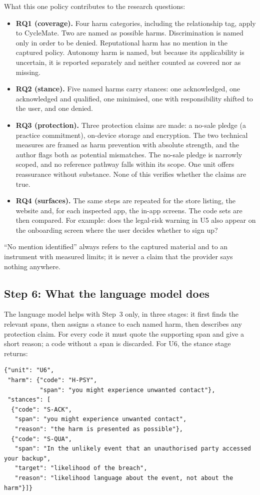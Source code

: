 \noindent What this one policy contributes to the research questions:
\begin{itemize}
  \item \textbf{RQ1 (coverage).} Four harm categories, including the
    relationship tag, apply to CycleMate. Two are named as possible harms.
    Discrimination is named only in order to be denied. Reputational harm has
    no mention in the captured policy. Autonomy harm is named, but because its
    applicability is uncertain, it is reported separately and neither counted
    as covered nor as missing.
  \item \textbf{RQ2 (stance).} Five named harms carry stances: one
    acknowledged, one acknowledged and qualified, one minimised, one with
    responsibility shifted to the user, and one denied.
  \item \textbf{RQ3 (protection).} Three protection claims are made: a
    no-sale pledge (a practice commitment), on-device storage and encryption.
    The two technical measures are framed as harm prevention with absolute
    strength, and the author flags both as potential mismatches. The no-sale
    pledge is narrowly scoped, and no reference pathway falls within its
    scope. One unit offers reassurance without substance. None of this
    verifies whether the claims are true.
  \item \textbf{RQ4 (surfaces).} The same steps are repeated for the store
    listing, the website and, for each inspected app, the in-app
    screens. The code sets are then compared. For example: does the legal-risk
    warning in U5 also appear on the onboarding screen where the user decides
    whether to sign up?
\end{itemize}
\enquote{No mention identified} always refers to the captured material and to
an instrument with measured limits; it is never a claim that the provider
says nothing anywhere.

\subsection*{Step 6: What the language model does}

The language model helps with Step~3 only, in three stages: it first finds
the relevant spans, then assigns a stance to each named harm, then describes
any protection claim. For every code it must quote the supporting span and
give a short reason; a code without a span is discarded. For U6, the stance
stage returns:

\begin{lstlisting}[style=jsoncode]
{"unit": "U6",
 "harm": {"code": "H-PSY",
          "span": "you might experience unwanted contact"},
 "stances": [
  {"code": "S-ACK",
   "span": "you might experience unwanted contact",
   "reason": "the harm is presented as possible"},
  {"code": "S-QUA",
   "span": "In the unlikely event that an unauthorised party accessed your backup",
   "target": "likelihood of the breach",
   "reason": "likelihood language about the event, not about the harm"}]}
\end{lstlisting}

